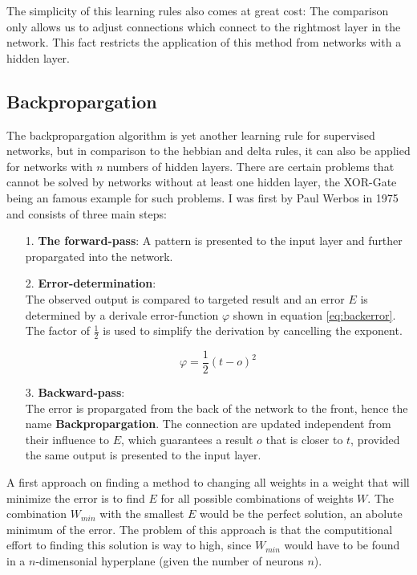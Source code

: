 \documentclass[10pt,a4paper,DIV=11]{scrreprt}
\begin{document}
The simplicity of this learning rules also comes at great cost: The comparison only allows us to adjust connections which connect to the rightmost layer in the network. This fact restricts the application of this method from networks with a hidden layer. 

\subsection{Backpropargation}

The backpropargation algorithm is yet another learning rule for supervised networks, but in comparison to the hebbian and delta rules, it can also be applied for networks with $n$ numbers of hidden layers. There are certain problems that cannot be solved by networks without at least one hidden layer, the XOR-Gate being an famous example for such problems. I was first  by Paul Werbos in 1975 \cite{BACK} and consists of three main steps:
\begin{itemize}
\item[1.] \textbf{The forward-pass}:
A pattern is presented to the input layer and further propargated into the network.
\item[2.] \textbf{Error-determination}:\\
The observed output is compared to targeted result and an error $E$ is determined by a derivale error-function $\varphi$ shown in equation \eqref{eq:backerror}. The factor of $\frac{1}{2}$ is used to simplify the derivation by cancelling the exponent.

\begin{equation}
\varphi = \frac{1}{2} (t-o)^2
\label{eq:backerror}
\end{equation}
\item[3.] \textbf{Backward-pass}:\\
The error is propargated from the back of the network to the front, hence the name \textbf{Backpropargation}. The connection are updated independent from their influence to $E$, which guarantees a result $o$ that is closer to $t$, provided the same output is presented to the input layer.
\end{itemize}

A first approach on finding a method to changing all weights in a weight that will minimize the error is to find $E$ for all possible combinations of weights $W$. The combination $W_{min}$ with the smallest $E$ would be the perfect solution, an abolute minimum of the error. The problem of this approach is that the computitional effort to finding this solution is way to high, since $W_{min}$ would have to be found in a $n$-dimensonial  hyperplane (given the number of neurons $n$).\\
\end{document}

